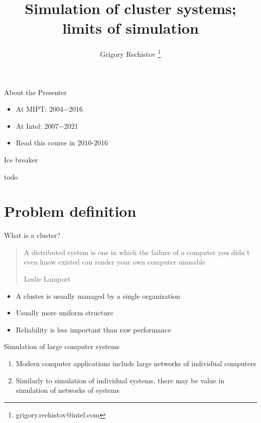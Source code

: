 

\author{Grigory Rechistov \thanks{grigory.rechistov@intel.com}}
\title{Simulation of cluster systems; limits of simulation}



\startslides

\begin{frame}{About the Presenter}
\begin{itemize}
\item At MIPT: 2004−2016
\item At Intel: 2007−2021
\item Read this course in 2010-2016
\end{itemize}
\end{frame}

\begin{frame}{Ice breaker}

todo

\end{frame}


\section{Problem definition}


\begin{frame}{What is a cluster?}

\begin{quotation}
A distributed system is one in which the failure of a computer you didn't even know existed can render your own computer unusable

Leslie Lamport
\end{quotation}

\begin{itemize}
    \item A cluster is usually managed by a single organization
    \item Usually more uniform structure
    \item Reliability is less important than raw performance
\end{itemize}

\end{frame}

\begin{frame}{Simulation of large computer systems}

\begin{enumerate}
    \item Modern computer applications include large networks of individual computers
    \item Similarly to simulation of individual systems, there may be value in simulation of networks of systems
\end{enumerate}

\end{frame}

